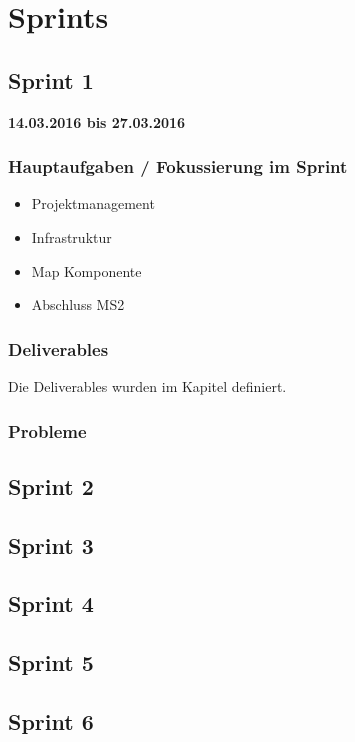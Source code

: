 \section{Sprints}
\subsection{Sprint 1}
\textbf{14.03.2016 bis 27.03.2016}

\subsubsection{Hauptaufgaben / Fokussierung im Sprint}
\begin{itemize}
	\item Projektmanagement
	\item Infrastruktur
	\item Map Komponente
	\item Abschluss MS2
\end{itemize}

\subsubsection{Deliverables}
Die Deliverables wurden im Kapitel  definiert.

\subsubsection{Probleme}


\subsection{Sprint 2}


\subsection{Sprint 3}


\subsection{Sprint 4}


\subsection{Sprint 5}


\subsection{Sprint 6}